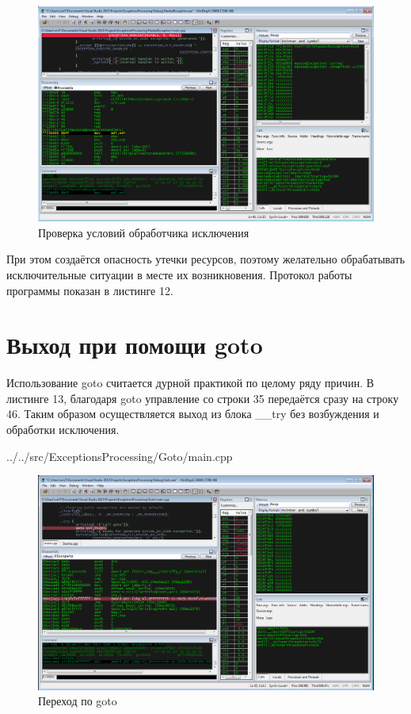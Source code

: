 \documentclass[a4paper, 12pt]{report}		%
\begin{document}
\begin{figure}[h!]
\centering
\includegraphics[scale=0.50]{res/009}
\caption{Проверка условий обработчика исключения}
\end{figure}

При этом создаётся опасность утечки ресурсов, поэтому желательно обрабатывать исключительные ситуации в месте их возникновения. Протокол работы программы показан в листинге 12.



\chapter*{Выход при помощи goto}

Использование goto считается дурной практикой по целому ряду причин. В листинге 13, благодаря goto управление со строки 35 передаётся сразу на строку 46. Таким образом осуществляется выход из блока \_\_try без возбуждения и обработки исключения.


{../../src/ExceptionsProcessing/Goto/main.cpp}

\begin{figure}[h!]
\centering
\includegraphics[scale=0.50]{res/010}
\caption{Переход по goto}
\end{figure}
\end{document}

